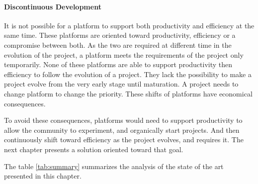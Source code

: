 
\paragraph{Discontinuous Development}

It is not possible for a platform to support both productivity and efficiency at the same time.
These platforms are oriented toward productivity, efficiency or a compromise between both.
As the two are required at different time in the evolution of the project, a platform meets the requirements of the project only temporarily.
None of these platforms are able to support productivity then efficiency to follow the evolution of a project.
They lack the possibility to make a project evolve from the very early stage until maturation. 
A project needs to change platform to change the priority.
These shifts of platforms have economical consequences.

To avoid these consequences, platforms would need to support productivity to allow the community to experiment, and organically start projects.
And then continuously shift toward efficiency as the project evolves, and requires it.
The next chapter presents a solution oriented toward that goal. 

\separator

The table \ref{tab:summary} summarizes the analysis of the state of the art presented in this chapter.


                                    \endinput


Some links I NEED to put :
--------------------------

https://glyph.twistedmatrix.com/2014/02/unyielding.html
http://calculist.org/blog/2011/12/14/why-coroutines-wont-work-on-the-web/

Transitions :
  - Linkedin - http://engineering.linkedin.com/architecture/brief-history-scaling-linkedin
  - Facebook - https://www.cs.princeton.edu/events/event/evolution-software-architecture-facebook / http://www.infoq.com/presentations/Evolution-of-Code-Design-at-Facebook
  - ... 

https://medium.com/@benorama/the-evolution-of-software-architecture-bd6ea674c477

https://en.wikipedia.org/wiki/Dataflow
https://en.wikipedia.org/wiki/Real-time_computing
https://en.wikipedia.org/wiki/Partitioned_global_address_space
https://en.wikipedia.org/wiki/SPMD

